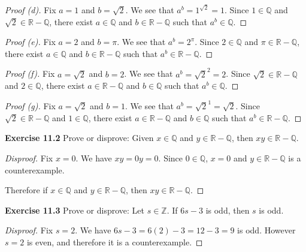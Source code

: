 \documentclass[12pt,oneside]{article}
\newenvironment{exercise}[1]{\vspace{.1in}\noindent\textbf{Exercise #1 \hspace{.05em}}}{}
\newcommand{\R}{\mathbb{R}}
\newcommand{\Z}{\mathbb{Z}}
\newcommand{\Q}{\mathbb{Q}}
\begin{document}
\begin{proof}[Proof (d)]
Fix $a = 1$ and $b = \sqrt{2}$. We see that $a^b = 1^{\sqrt{2}} = 1$. Since $1 \in \Q$ and $\sqrt{2} \in \R - \Q$, there exist $a \in \Q$ and $b \in \R - \Q$ such that $a^b \in \Q$.
\end{proof}

\begin{proof}[Proof (e)]
Fix $a = 2$ and $b = \pi$. We see that $a^b = 2^{\pi}$. Since $2 \in \Q$ and $\pi \in \R - \Q$, there exist $a \in \Q$ and $b \in \R - \Q$ such that $a^b \in \R - \Q$.
\end{proof}

\begin{proof}[Proof (f)]
Fix $a = \sqrt{2}$ and $b = 2$. We see that $a^b = \sqrt{2}^2 = 2$. Since $\sqrt{2} \in \R - \Q$ and $2 \in \Q$, there exist $a \in \R - \Q$ and $b \in \Q$ such that $a^b \in \Q$.
\end{proof}

\begin{proof}[Proof (g)]
Fix $a = \sqrt{2}$ and $b = 1$. We see that $a^b = \sqrt{2}^1 = \sqrt{2}$. Since $\sqrt{2} \in \R - \Q$ and $1 \in \Q$, there exist $a \in \R - \Q$ and $b \in \Q$ such that $a^b \in \R - \Q$.
\end{proof}



\begin{exercise}{11.2}
Prove or disprove: Given $x \in \Q$ and $y \in \R - \Q$, then $xy \in \R - \Q$.
\end{exercise}

\begin{proof}[Disproof]
Fix $x = 0$. We have $xy = 0y = 0$. Since $0 \in \Q$, $x = 0$ and $y \in \R - \Q$ is a counterexample.

Therefore if $x \in \Q$ and $y \in \R - \Q$, then $xy \in \R - \Q$.
\end{proof}



\begin{exercise}{11.3}
Prove or disprove: Let $s \in \Z$. If $6s - 3$ is odd, then $s$ is odd.
\end{exercise}

\begin{proof}[Disproof]
Fix $s = 2$. We have
$6s - 3 = 6(2) - 3 = 12 - 3 = 9$
is odd. However $s = 2$ is even, and therefore it is a counterexample.
\end{proof}
\end{document}
